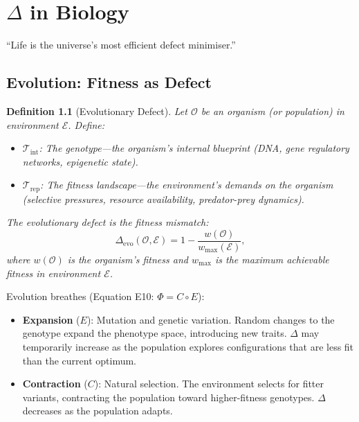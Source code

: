 \documentclass[12pt, openany]{book}
\newtheorem{definition}[theorem]{Definition}
\theoremstyle{remark}
\newcommand{\Tint}{\mathcal{T}_{\mathrm{int}}}
\newcommand{\Trep}{\mathcal{T}_{\mathrm{rep}}}
\begin{document}
\chapter{$\Delta$ in Biology}
\label{ch:biology}

\epigraph{``Life is the universe's most efficient defect minimiser.''}{}

\section{Evolution: Fitness as Defect}
\label{sec:evolution}

\begin{definition}[Evolutionary Defect]
\label{def:evo-defect}
Let $\mathcal{O}$ be an organism (or population) in environment $\mathcal{E}$.  Define:
\begin{itemize}
  \item $\Tint$: The genotype---the organism's internal blueprint (DNA, gene regulatory
        networks, epigenetic state).
  \item $\Trep$: The fitness landscape---the environment's demands on the organism
        (selective pressures, resource availability, predator-prey dynamics).
\end{itemize}
The evolutionary defect is the fitness mismatch:
\[
  \Delta_{\mathrm{evo}}(\mathcal{O}, \mathcal{E}) = 1 - \frac{w(\mathcal{O})}{w_{\max}(\mathcal{E})},
\]
where $w(\mathcal{O})$ is the organism's fitness and $w_{\max}$ is the maximum
achievable fitness in environment $\mathcal{E}$.
\end{definition}

\noindent
Evolution breathes (Equation E10: $\Phi = C \circ E$):
\begin{itemize}
  \item \textbf{Expansion} ($E$): Mutation and genetic variation.  Random changes to the
        genotype expand the phenotype space, introducing new traits.  $\Delta$ may
        temporarily increase as the population explores configurations that are
        less fit than the current optimum.
  \item \textbf{Contraction} ($C$): Natural selection.  The environment selects for
        fitter variants, contracting the population toward higher-fitness genotypes.
        $\Delta$ decreases as the population adapts.
\end{itemize}
\end{document}
